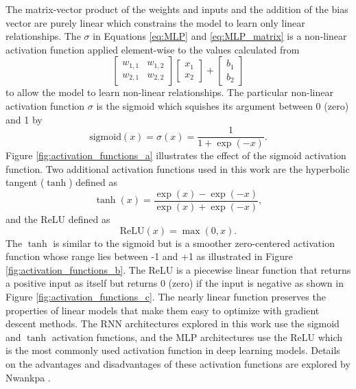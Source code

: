 The matrix-vector product of the weights and inputs and the addition of the bias vector are purely linear which constrains the model to learn only linear relationships. The $\sigma$ in Equations \ref{eq:MLP} and \ref{eq:MLP_matrix} is a non-linear activation function applied element-wise to the values calculated from 
\[
\begin{bmatrix}
	w_{1,1} & w_{1,2} \\
	w_{2,1} & w_{2,2}
\end{bmatrix}
\begin{bmatrix}
	x_{1} \\
	x_{2}
\end{bmatrix}
+
\begin{bmatrix}
	b_{1} \\
	b_{2}
\end{bmatrix}
\]
to allow the model to learn non-linear relationships. The particular non-linear activation function $\sigma$ is the sigmoid which squishes its argument between 0 (zero) and 1 by
\begin{equation} \label{eq:sigmoid}
	\text{sigmoid}\left(x\right) = \sigma \left(x\right) = \frac{1}{1 + \exp \left(-x\right)}.
\end{equation}
Figure \ref{fig:activation_functions_a} \cite{PyTorch} illustrates the effect of the sigmoid activation function. Two additional activation functions used in this work are the hyperbolic tangent ($\tanh$) defined as
\begin{equation} \label{eq:tanh}
	\tanh \left(x\right) = \frac{\exp \left(x\right) - \exp \left(-x\right)}{\exp \left(x\right) + \exp \left(-x\right)},
\end{equation}
and the \ac{ReLU} defined as
\begin{equation} \label{eq:relu}
	\text{ReLU} \left(x\right) = \max \left(0, x\right).
\end{equation}
The $\tanh$ is similar to the sigmoid but is a smoother zero-centered activation function whose range lies between -1 and +1 as illustrated in Figure \ref{fig:activation_functions_b}. The \ac{ReLU} is a piecewise linear function that returns a positive input as itself but returns 0 (zero) if the input is negative as shown in Figure \ref{fig:activation_functions_c}. The nearly linear function preserves the properties of linear models that make them easy to optimize with gradient descent methods. The \ac{RNN} architectures explored in this work use the sigmoid and $\tanh$ activation functions, and the \ac{MLP} architectures use the ReLU which is the most commonly used activation function in deep learning models. Details on the advantages and disadvantages of these activation functions are explored by Nwankpa \cite{activationfunctions}.
